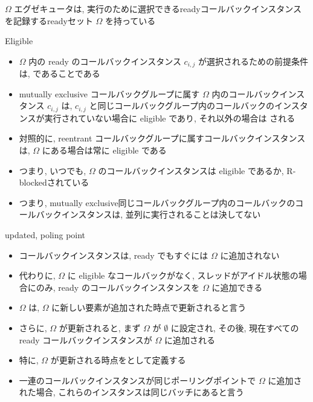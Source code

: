 \begin{frame}{$\Omega$}
    エグゼキュータは, 実行のために選択できるreadyコールバックインスタンスを記録するreadyセット $\Omega$ を持っている
\end{frame}

\begin{frame}{Eligible}
    \begin{itemize}
        \item $\Omega$ 内の ready のコールバックインスタンス $c_{i, j}$ が選択されるための前提条件は,  であることである
        \item mutually exclusive コールバックグループに属す $\Omega$ 内のコールバックインスタンス $c_{i, j}$ は, $c_{i, j}$ と同じコールバックグループ内のコールバックのインスタンスが実行されていない場合に eligible であり, それ以外の場合は  される
        \item 対照的に, reentrant コールバックグループに属すコールバックインスタンスは, $\Omega$ にある場合は常に eligible である
        \item つまり, いつでも, $\Omega$ のコールバックインスタンスは eligible であるか, R-blockedされている
        \item つまり, mutually exclusive同じコールバックグループ内のコールバックのコールバックインスタンスは, 並列に実行されることは決してない
    \end{itemize}
\end{frame}

\begin{frame}{updated, poling point}
    \begin{itemize}
        \item コールバックインスタンスは, ready でもすぐには $\Omega$ に追加されない
        \item 代わりに, $\Omega$ に eligible なコールバックがなく, スレッドがアイドル状態の場合にのみ, ready のコールバックインスタンスを $\Omega$ に追加できる
        \item $\Omega$ は, $\Omega$ に新しい要素が追加された時点で更新されると言う
        \item さらに, $\Omega$ が更新されると, まず $\Omega$ が $\emptyset$ に設定され, その後, 現在すべての ready コールバックインスタンスが $\Omega$ に追加される
        \item 特に, $\Omega$ が更新される時点をとして定義する
        \item 一連のコールバックインスタンスが同じポーリングポイントで $\Omega$ に追加された場合, これらのインスタンスは同じバッチにあると言う
    \end{itemize}
\end{frame}

